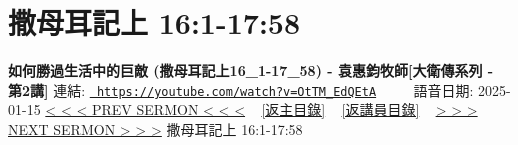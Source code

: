 \documentclass{book}
\begin{document}
\section{撒母耳記上 16:1-17:58}
\label{sec:OtTM_EdQEtA}
\textbf{如何勝過生活中的巨敵 (撒母耳記上16\_1-17\_58) - 袁惠鈞牧師[大衛傳系列 - 第2講]}
\newline
\newline
連結: \href{https://youtube.com/watch?v=OtTM_EdQEtA}{\texttt{ https://youtube.com/watch?v=OtTM\_EdQEtA}} ~~~~ 語音日期: 2025-01-15 
\newline
\newline
\hyperref[sec:OFW3ofO9w3Y]{< < < PREV SERMON < < <}
~
\hyperlink{toc}{[返主目錄]}
~
\hyperref[ch:preacher10]{[返講員目錄]}
~
\hyperref[sec:9t69tF6ci0k]{> > > NEXT SERMON > > >}
\newline
\newline
撒母耳記上 16:1-17:58
\newline
\end{document}

